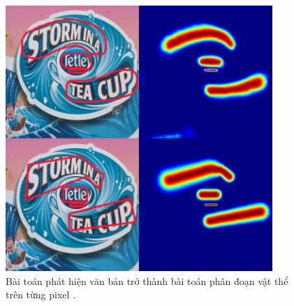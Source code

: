 \begin{itemize}
\begin{figure}
\centering
\includegraphics[width=0.9\textwidth]{mep_img/tutorial_segmentation.png}
\caption{Bài toán phát hiện văn bản trở thành bài toán phân đoạn vật thể trên từng pixel \cite{ocr_struct}.}\label{fig_2.5}
\end{figure}

\end{itemize}


